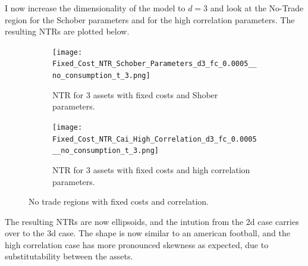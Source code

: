 \documentclass[11pt]{article}
\begin{document}
I now increase the dimensionality of the model to $d = 3$ and look at the No-Trade region for the Schober parameters and for the high correlation parameters.
The resulting \ac{NTR}s are plotted below.
\begin{figure}[!ht]
    \centering
    \begin{subfigure}[t]{0.48\textwidth}
        \centering
        \texttt{[image: Fixed\_Cost\_NTR\_Schober\_Parameters\_d3\_fc\_0.0005\_\_no\_consumption\_t\_3.png]}
        \caption{NTR for 3 assets with fixed costs and Shober parameters.}
        \label{fig: NTR_Fixed_3d_Shober}
    
    \end{subfigure}%
    \hfill
    \begin{subfigure}[t]{0.48\textwidth}
        \centering
        \texttt{[image: Fixed\_Cost\_NTR\_Cai\_High\_Correlation\_d3\_fc\_0.0005\_\_no\_consumption\_t\_3.png]}
        \caption{NTR for 3 assets with fixed costs and high correlation parameters.}
        \label{fig: NTR_Fixed_3d_high_correlation}
    \end{subfigure}
    \caption{No trade regions with fixed costs and correlation.}
\end{figure}
\FloatBarrier %
The resulting NTRs are now ellipsoids, and the intution from the $2$d case carries over to the $3$d case.
The shape is now similar to an american football, and the high correlation case has more pronounced skewness as expected, due to substitutability between the assets.
\end{document}
